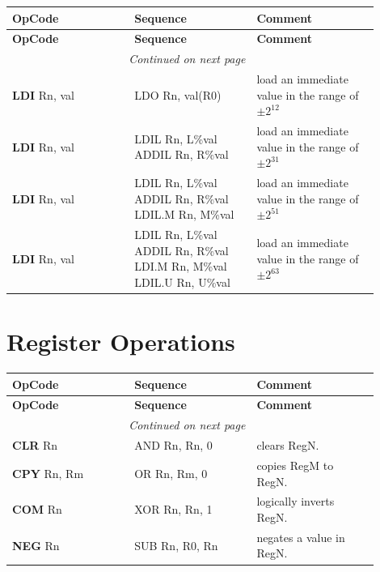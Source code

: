 \begin{longtable}{@{}p{0.3\linewidth}p{0.3\linewidth}p{0.3\linewidth}@{}}
    \toprule
    \textbf{OpCode} & \textbf{Sequence} & \textbf{Comment} \\
    \midrule
    \endfirsthead
    \toprule
    \textbf{OpCode} & \textbf{Sequence} & \textbf{Comment} \\
    \midrule
    \endhead
    \midrule
    \multicolumn{2}{r}{\textit{Continued on next page}} \\
    \midrule
    \endfoot
    \bottomrule
    \endlastfoot
    \textbf{LDI} Rn, val & LDO Rn, val(R0) & load an immediate value in the range of $\pm 2^{12}$ \\
	\midrule
	\textbf{LDI} Rn, val & LDIL Rn, L\%val \newline ADDIL Rn, R\%val & load an immediate value in the range of $\pm 2^{31}$ \\
	\midrule
	\textbf{LDI} Rn, val & LDIL Rn, L\%val \newline ADDIL Rn, R\%val \newline LDIL.M Rn, M\%val & load an immediate value in the range of $\pm 2^{51}$ \\
	\midrule
	\textbf{LDI} Rn, val & LDIL Rn, L\%val \newline ADDIL Rn, R\%val \newline LDI.M Rn, M\%val  \newline LDIL.U Rn, U\%val & load an immediate value in the range of $\pm 2^{63}$ \\
	\midrule
\end{longtable}

\section*{Register Operations}

\begin{longtable}{@{}p{0.3\linewidth}p{0.3\linewidth}p{0.3\linewidth}@{}}
    \toprule
    \textbf{OpCode} & \textbf{Sequence} & \textbf{Comment} \\
    \midrule
    \endfirsthead
    \toprule
    \textbf{OpCode} & \textbf{Sequence} & \textbf{Comment} \\
    \midrule
    \endhead
    \midrule
    \multicolumn{2}{r}{\textit{Continued on next page}} \\
    \midrule
    \endfoot
    \bottomrule
    \endlastfoot
    \textbf{CLR} Rn & AND Rn, Rn, 0 & clears RegN. \\
    \midrule
    \textbf{CPY} Rn, Rm & OR Rn, Rm, 0 & copies RegM to RegN. \\
    \midrule
    \textbf{COM} Rn & XOR Rn, Rn, 1 & logically inverts RegN. \\
    \midrule
    \textbf{NEG} Rn & SUB Rn, R0, Rn & negates a value in RegN. \\
    \midrule
\end{longtable}

